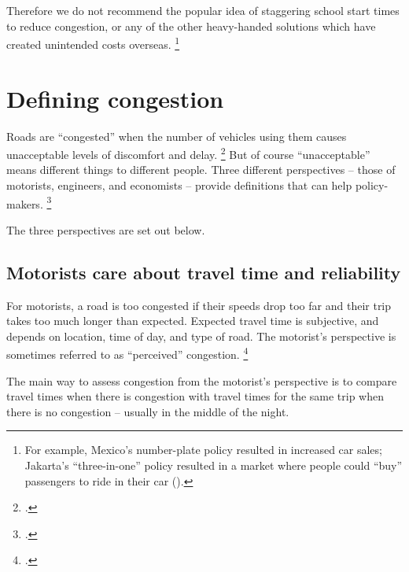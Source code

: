 \documentclass{grattan}
\begin{document}
Therefore we do not recommend the popular idea of staggering school start times to reduce congestion, or any of the other heavy-handed solutions which have created unintended costs overseas.%
    \footnote{For example, Mexico’s number-plate policy resulted in increased car sales; Jakarta's “three-in-one” policy resulted in a market where people could ``buy'' passengers to ride in their car (\textcite{congestion-Mexico-cityl}).}


















\appendix
\chapter{Defining congestion}\label{chap:appendix-defining-congestion}

Roads are “congested” when the number of vehicles using them causes unacceptable levels of discomfort and delay.%
    \footcite[][93]{Falcocchio-and-Levinson-congestion-a-concise-guide}
But of course “unacceptable” means different things to different people. Three different perspectives – those of motorists, engineers, and economists -- provide definitions that can help policy-makers.%
    \footcite[][7]{Wallis-Lupton-2013-NZ-Transport-Agency}

\label{para:three-perspectives-on-congestion--intro}
The three perspectives are set out below.

\section{Motorists care about travel time and reliability}\label{subsec:road-users-perspective}
For motorists, a road is too congested if their speeds drop too far and their trip takes too much longer than expected. Expected travel time is subjective, and depends on location, time of day, and type of road. The motorist's perspective is sometimes referred to as “perceived” congestion.%
    \footcite[][108]{Falcocchio-and-Levinson-congestion-a-concise-guide}

The main way to assess congestion from the motorist's perspective is to compare travel times when there is congestion with travel times for the same trip when there is no congestion – usually in the middle of the night.
\end{document}
